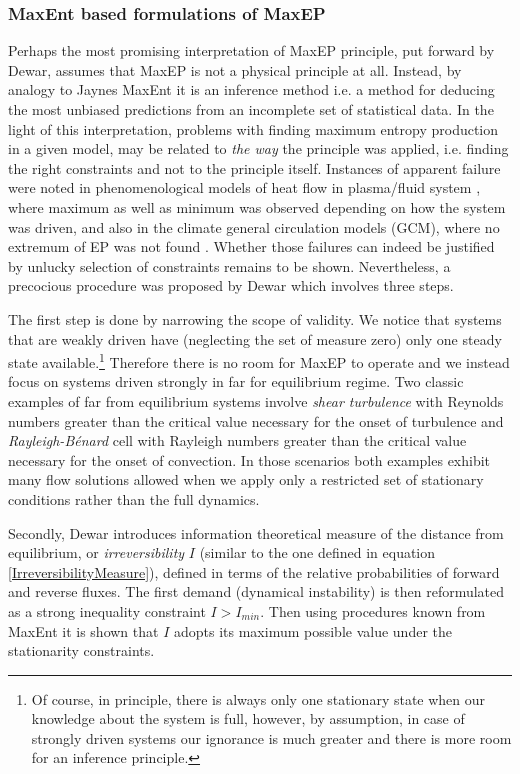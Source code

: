\documentclass[a4paper,12pt]{article}
\begin{document}
\subsubsection{MaxEnt based formulations of MaxEP}

Perhaps the most promising interpretation of MaxEP principle, put forward by Dewar\cite{Dewar:775452, Dewar:2009fg, Dewar:2005eo}, assumes that MaxEP is not a physical principle at all. Instead, by analogy to Jaynes MaxEnt it is an inference method i.e. a method for deducing the most unbiased predictions from an incomplete set of statistical data. In the light of this interpretation, problems with finding maximum entropy production in a given model, may be related to \textit{the way} the principle was applied, i.e. finding the right constraints and not to the principle itself.
Instances of apparent failure were noted in phenomenological models of heat flow in plasma/fluid system \cite{Kawazura:2010dy}, where maximum as well as minimum was observed depending on how the system was driven, and also in the climate general circulation models (GCM), where no extremum of EP was not found \cite{Dewar:2014ek}.
Whether those failures can indeed be justified by unlucky selection of constraints remains to be shown. Nevertheless, a precocious procedure was proposed by Dewar which involves three steps.

The first step is done by narrowing the scope of validity. We notice that systems that are weakly driven have (neglecting the set of measure zero) only one steady state available.\footnote{Of course, in principle, there is always only one stationary state when our knowledge about the system is full, however, by assumption, in case of strongly driven systems our ignorance is much greater and there is more room for an inference principle.} Therefore there is no room for MaxEP to operate and we instead focus on systems driven strongly in far for equilibrium regime.
Two classic examples of far from equilibrium systems involve \textit{shear turbulence} with Reynolds numbers greater than the critical value necessary for the onset of turbulence and \textit{Rayleigh-Bénard} cell with Rayleigh numbers greater than the critical value necessary for the onset of convection.
In those scenarios both examples exhibit many flow solutions allowed when we apply only a restricted set of stationary conditions rather than the full dynamics.

Secondly, Dewar introduces information theoretical measure of the distance from equilibrium, or \textit{irreversibility} $I$ (similar to the one defined in equation \ref{IrreversibilityMeasure}), defined in terms of the relative probabilities of forward and reverse fluxes. 
The first demand (dynamical instability) is then reformulated as a strong inequality constraint $I>I_{min}$. 
Then using procedures known from MaxEnt it is shown that $I$ adopts its maximum possible value under the stationarity constraints.
\end{document}

